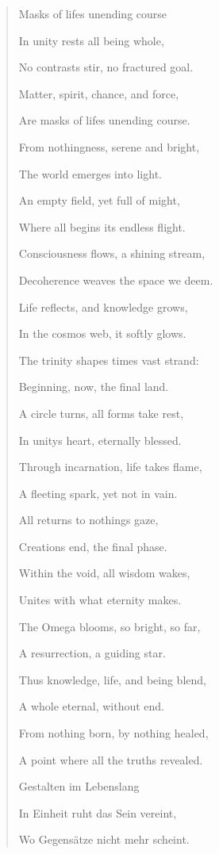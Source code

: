 \documentclass[
  ngerman,
]{article}
\begin{document}
\begin{quote}
Masks of life\textquotesingle s unending course

In unity rests all being whole,

No contrasts stir, no fractured goal.

Matter, spirit, chance, and force,

Are masks of life\textquotesingle s unending course.

From nothingness, serene and bright,

The world emerges into light.

An empty field, yet full of might,

Where all begins its endless flight.

Consciousness flows, a shining stream,

Decoherence weaves the space we deem.

Life reflects, and knowledge grows,

In the cosmos\textquotesingle{} web, it softly glows.

The trinity shapes time\textquotesingle s vast strand:

Beginning, now, the final land.

A circle turns, all forms take rest,

In unity\textquotesingle s heart, eternally blessed.

Through incarnation, life takes flame,

A fleeting spark, yet not in vain.

All returns to nothing\textquotesingle s gaze,

Creation\textquotesingle s end, the final phase.

Within the void, all wisdom wakes,

Unites with what eternity makes.

The Omega blooms, so bright, so far,

A resurrection, a guiding star.

Thus knowledge, life, and being blend,

A whole eternal, without end.

From nothing born, by nothing healed,

A point where all the truth\textquotesingle s revealed.

Gestalten im Lebenslang

In Einheit ruht das Sein vereint,

Wo Gegensätze nicht mehr scheint.


\end{quote}
\end{document}
